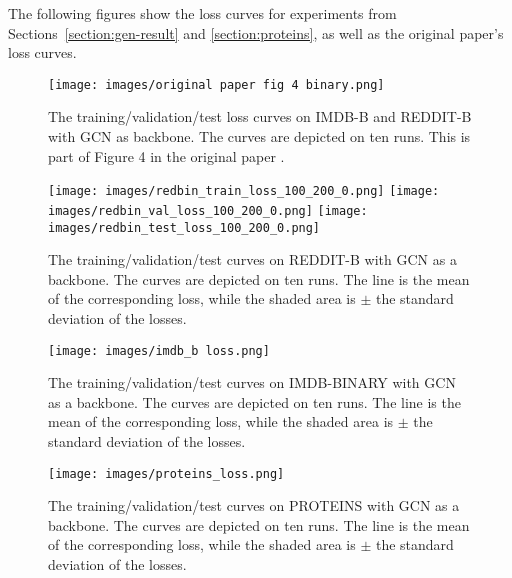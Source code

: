  The following figures show the loss curves for experiments from Sections~\ref{section:gen-result} and \ref{section:proteins}, as well as the original paper's loss curves.

 \begin{figure}[H]
    \centering
    \texttt{[image: images/original paper fig 4 binary.png]}
    \caption{The training/validation/test loss curves on IMDB-B and REDDIT-B with GCN as backbone. The curves are depicted on ten runs. This is part of Figure 4 in the original paper \cite{Han:2022}.}
    \label{fig:paper_loss_fig}
\end{figure}

\begin{figure}
    \centering
    \texttt{[image: images/redbin\_train\_loss\_100\_200\_0.png]}
    \texttt{[image: images/redbin\_val\_loss\_100\_200\_0.png]}
    \texttt{[image: images/redbin\_test\_loss\_100\_200\_0.png]}
    \caption{The training/validation/test curves on REDDIT-B with GCN as a backbone. The curves are depicted on ten runs. The line is the mean of the corresponding loss, while the shaded area is $\pm$ the standard deviation of the losses.}
    \label{fig:redbintraintestvallosscurves}
\end{figure}




\begin{figure}
    \centering
    \texttt{[image: images/imdb\_b loss.png]}
    \caption{The training/validation/test curves on IMDB-BINARY with GCN as a backbone. The curves are depicted on ten runs. The line is the mean of the corresponding loss, while the shaded area is $\pm$ the standard deviation of the losses.}
    \label{fig:imdbbintraintestvallosscurves}
\end{figure}

\begin{figure}
    \centering
    \texttt{[image: images/proteins\_loss.png]}
    \caption{The training/validation/test curves on PROTEINS with GCN as a backbone. The curves are depicted on ten runs. The line is the mean of the corresponding loss, while the shaded area is $\pm$ the standard deviation of the losses.}
    \label{fig:proteinstraintestvallosscurves}
\end{figure}

